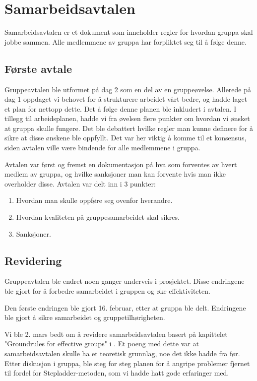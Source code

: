 \section{Samarbeidsavtalen}
Samarbeidsavtalen er et dokument som inneholder regler for hvordan gruppa skal jobbe sammen.
Alle medlemmene av gruppa har forpliktet seg til å følge denne.

\subsection{Første avtale}
Gruppeavtalen ble utformet på dag 2 som en del av en gruppeøvelse.
Allerede på dag 1 oppdaget vi behovet for å strukturere arbeidet vårt bedre, og hadde laget et plan for nettopp dette.
Det å følge denne planen ble inkludert i avtalen. 
I tillegg til arbeidsplanen, hadde vi fra øvelsen flere punkter om hvordan vi ønsket at gruppa skulle fungere.
Det ble debattert hvilke regler man kunne definere for å sikre at disse ønskene ble oppfyllt.
Det var her viktig å komme til et konsensus, siden avtalen ville være bindende for alle medlemmene i gruppa.

Avtalen var først og fremst en dokumentasjon på hva som forventes av hvert
medlem av gruppa, og hvilke sanksjoner man kan forvente hvis man ikke
overholder disse. Avtalen var delt inn i 3 punkter: 
\begin{enumerate}
	\item Hvordan man skulle oppføre seg ovenfor hverandre.
	\item Hvordan kvaliteten på gruppesamarbeidet skal sikres.
	\item Sanksjoner.
\end{enumerate}

\subsection{Revidering}
Gruppeavtalen ble endret noen ganger underveis i prosjektet.
Disse endringene ble gjort for å forbedre samarbeidet i gruppen og øke effektiviteten.

Den første endringen ble gjort 16. februar, etter at gruppa ble delt.
Endringene ble gjort å sikre samarbeidet og gruppetilhørigheten.

Vi ble 2. mars bedt om å revidere samarbeidsavtalen basert på kapittelet "Groundrules for effective groups" i \cite{groundrules}.
Et poeng med dette var at samarbeidsavtalen skulle ha et teoretisk grunnlag, noe det ikke hadde fra før.
Etter diskusjon i gruppa, ble steg for steg planen for å angripe problemer fjernet til fordel for Stepladder-metoden, som vi hadde hatt gode erfaringer med.


